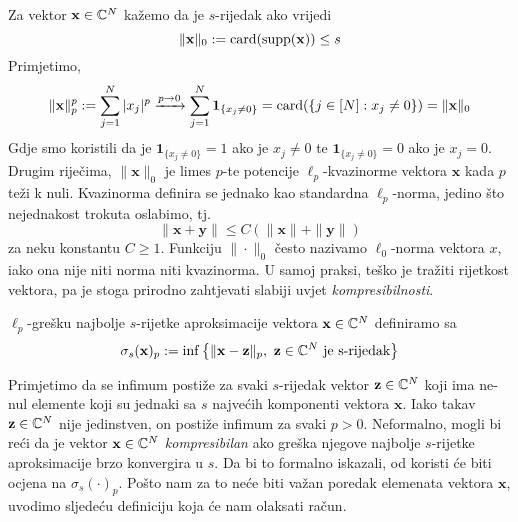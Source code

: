 \documentclass[a4paper,twoside,12pt]{memoir} %
\newcommand{\vect}[1]{\mathbf{#1}}
\renewcommand{\vec}{\vect}
\newcommand{\card}{\text{\normalfont{card}}}
\newcommand{\supp}{\text{\normalfont{supp}}}
\begin{document}
\noindent Za vektor $\vec{x}\in\C^{N}$ ka\v{z}emo da je $s$-rijedak ako vrijedi $$\|\vec{x}\|_0 := \card(\supp(\vec{x})) \leq s$$
Primjetimo,
$$\|\vec{x}\|_p^p := \sum_{j=1}^N|x_j|^p \xrightarrow{p\rightarrow 0} \sum_{j=1}^N\mathbf{1}_{\{x_j \neq 0\}} = \card(\{j \in [N]:x_j \neq 0\}) = \|\vec{x}\|_0$$
Gdje smo koristili da je $\mathbf{1}_{\{x_j \neq 0\}} = 1$  ako je $x_j \neq 0$ te $\mathbf{1}_{\{x_j \neq 0\}} = 0$  ako je $x_j = 0$. Drugim rije\v{c}ima, $\|\vec{x}\|_0$ je limes $p$-te potencije $\ell_p$-kvazinorme vektora $\vec{x}$ kada $p$ te\v{z}i k nuli. Kvazinorma definira se jednako kao standardna $\ell_p$-norma, jedino \v{s}to nejednakost trokuta oslabimo, tj. 
$$\|\vec{x}+\vec{y}\|\leq C(\|\vec{x}\|+\|\vec{y}\|)$$ 
za neku konstantu $C \geq 1$.
Funkciju $\|\cdot\|_0$ \v{c}esto nazivamo $\ell_0$-norma vektora $x$, iako  ona nije niti norma niti kvazinorma. U samoj praksi, te\v{s}ko je tra\v{z}iti rijetkost vektora, pa je stoga prirodno zahtjevati slabiji uvjet \textit{kompresibilnosti}.  
\begin{defn}\label{greska_naj_s_aprox}
    $\ell_p$-gre\v{s}ku najbolje $s$-rijetke aproksimacije vektora $\vec{x}\in\C^{N}$ definiramo sa 
    $$\sigma_s(\vec{x})_p := \inf\big\{\|\vec{x}-\vec{z}\|_p,\ \vec{z} \in \C^{N} \ \text{je s-rijedak}\big\}$$
\end{defn}
\indent Primjetimo da se infimum posti\v{z}e za svaki $s$-rijedak vektor $\vec{z} \in \C^{N}$ koji ima ne-nul elemente koji su jednaki sa $s$ najve\'cih komponenti vektora $\vec{x}$. Iako takav $\vec{z} \in \C^{N}$ nije jedinstven, on posti\v{z}e infimum za svaki $p > 0$. Neformalno, mogli bi re\'ci da je vektor $\vec{x} \in \C^{N}$ \textit{kompresibilan} ako gre\v{s}ka njegove najbolje $s$-rijetke aproksimacije brzo konvergira u $s$. Da bi to formalno iskazali, od koristi \'ce biti ocjena na $\sigma_s(\cdot)_p$. Po\v{s}to nam za to ne\'ce biti va\v{z}an poredak elemenata vektora $\vec{x}$, uvodimo sljede\'cu definiciju koja \'ce nam olaksati ra\v{c}un.
\end{document}
